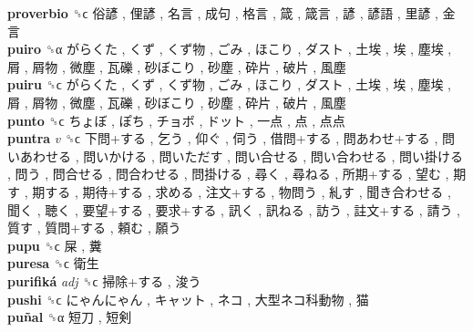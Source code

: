 \textbf{proverbio} ␝ϲ   俗諺 ,  俚諺 ,  名言 ,  成句 ,  格言 ,  箴 ,  箴言 ,  諺 ,  諺語 ,  里諺 ,  金言   \\
\textbf{puiro} ␝α   がらくた ,  くず ,  くず物 ,  ごみ ,  ほこり ,  ダスト ,  土埃 ,  埃 ,  塵埃 ,  屑 ,  屑物 ,  微塵 ,  瓦礫 ,  砂ぼこり ,  砂塵 ,  砕片 ,  破片 ,  風塵   \\
\textbf{puiru} ␝ϲ   がらくた ,  くず ,  くず物 ,  ごみ ,  ほこり ,  ダスト ,  土埃 ,  埃 ,  塵埃 ,  屑 ,  屑物 ,  微塵 ,  瓦礫 ,  砂ぼこり ,  砂塵 ,  砕片 ,  破片 ,  風塵   \\
\textbf{punto} ␝ϲ   ちょぼ ,  ぽち ,  チョボ ,  ドット ,  一点 ,  点 ,  点点   \\
\textbf{puntra} \emph{v}  ␝ϲ   下問+する ,  乞う ,  仰ぐ ,  伺う ,  借問+する ,  問あわせ+する ,  問いあわせる ,  問いかける ,  問いただす ,  問い合せる ,  問い合わせる ,  問い掛ける ,  問う ,  問合せる ,  問合わせる ,  問掛ける ,  尋く ,  尋ねる ,  所期+する ,  望む ,  期す ,  期する ,  期待+する ,  求める ,  注文+する ,  物問う ,  糺す ,  聞き合わせる ,  聞く ,  聴く ,  要望+する ,  要求+する ,  訊く ,  訊ねる ,  訪う ,  註文+する ,  請う ,  質す ,  質問+する ,  頼む ,  願う   \\
\textbf{pupu} ␝ϲ   屎 ,  糞   \\
\textbf{puresa} ␝ϲ   衛生   \\
\textbf{purifiká} \emph{adj}  ␝ϲ   掃除+する ,  浚う   \\
\textbf{pushi} ␝ϲ   にゃんにゃん ,  キャット ,  ネコ ,  大型ネコ科動物 ,  猫   \\
\textbf{puñal} ␝α   短刀 ,  短剣   \\
